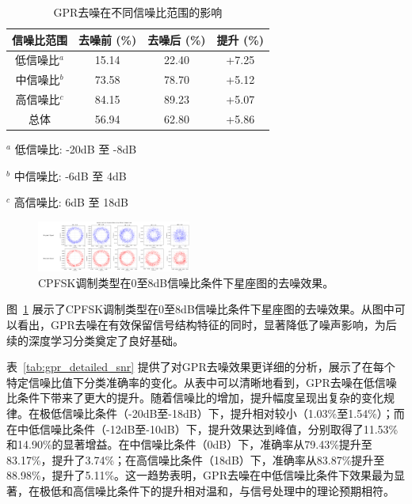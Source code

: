 \documentclass{article}
\begin{document}
\begin{table}[!htbp]
\centering
\caption{GPR去噪在不同信噪比范围的影响}
\label{tab:gpr_impact}
\begin{threeparttable}
\begin{tabular}{@{}cccc@{}}
\toprule
信噪比范围 & 去噪前 (\%) & 去噪后 (\%) & 提升 (\%) \\
\midrule
低信噪比$^{a}$ & 15.14 & 22.40 & +7.25 \\
中信噪比$^{b}$ & 73.58 & 78.70 & +5.12 \\
高信噪比$^{c}$ & 84.15 & 89.23 & +5.07 \\
总体 & 56.94 & 62.80 & +5.86 \\
\bottomrule
\end{tabular}
\begin{tablenotes}
\footnotesize
\item[$^{a}$] 低信噪比: -20dB 至 -8dB
\item[$^{b}$] 中信噪比: -6dB 至 4dB  
\item[$^{c}$] 高信噪比: 6dB 至 18dB
\end{tablenotes}
\end{threeparttable}
\end{table}

\begin{figure}[htbp]
\centering
\includegraphics[width=0.45\textwidth]{figure/constellation_denoising.png}
\caption{CPFSK调制类型在0至8dB信噪比条件下星座图的去噪效果。}
\label{fig:constellation_denoising}
\end{figure}

图~\ref{fig:constellation_denoising} 展示了CPFSK调制类型在0至8dB信噪比条件下星座图的去噪效果。从图中可以看出，GPR去噪在有效保留信号结构特征的同时，显著降低了噪声影响，为后续的深度学习分类奠定了良好基础。

表~\ref{tab:gpr_detailed_snr} 提供了对GPR去噪效果更详细的分析，展示了在每个特定信噪比值下分类准确率的变化。从表中可以清晰地看到，GPR去噪在低信噪比条件下带来了更大的提升。随着信噪比的增加，提升幅度呈现出复杂的变化规律。在极低信噪比条件（-20dB至-18dB）下，提升相对较小（1.03\%至1.54\%）；而在中低信噪比条件（-12dB至-10dB）下，提升效果达到峰值，分别取得了11.53\%和14.90\%的显著增益。在中信噪比条件（0dB）下，准确率从79.43\%提升至83.17\%，提升了3.74\%；在高信噪比条件（18dB）下，准确率从83.87\%提升至88.98\%，提升了5.11\%。这一趋势表明，GPR去噪在中低信噪比条件下效果最为显著，在极低和高信噪比条件下的提升相对温和，与信号处理中的理论预期相符。
\end{document}
